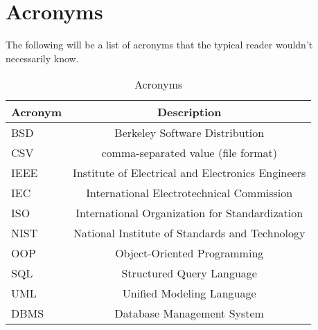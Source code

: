 \documentclass[letterpaper,12pt,oneside,listof=totoc]{scrreprt}
\begin{document}
\section{Acronyms}
The following will be a list of acronyms that the typical reader wouldn't necessarily know.

\begin{table}[hbt!]
    \centering
    \begin{tabular}{ || m{5em} | c || }
    \hline
    Acronym & Description\\
    \hline\hline
    BSD & Berkeley Software Distribution\\
    \hline
    CSV & comma-separated value (file format)\\
    \hline
    IEEE & Institute of Electrical and Electronics Engineers\\
    \hline
    IEC & International Electrotechnical Commission\\
    \hline
    ISO & International Organization for Standardization\\
    \hline
    NIST & National Institute of Standards and Technology\\
    \hline
    OOP & Object-Oriented Programming\\
    \hline
    SQL & Structured Query Language\\
    \hline
    UML & Unified Modeling Language\\
    \hline
    DBMS & Database Management System\\
    \hline
    \end{tabular}
    \caption{Acronyms}
    \label{tab:acronyms}
\end{table}

\clearpage
\end{document}
